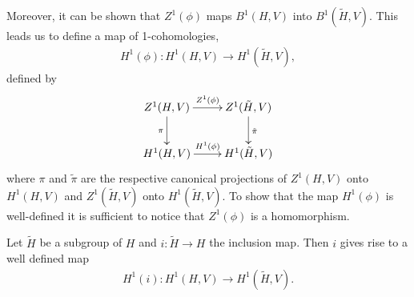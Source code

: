 Moreover, it can be shown that $Z^1(\phi)$ maps $B^1(H, V)$ into $B^1(\tilde{H}, V)$. This leads us to define a map of 1-cohomologies,
\begin{eqnarray*}
	H^1(\phi):H^1(H, V) \rightarrow H^1(\tilde{H}, V),
\end{eqnarray*}
defined by
\begin{displaymath}
	\xymatrix{
	Z^1(H, V) \ar[d]_{\pi} \ar[r]^{Z^1(\phi)} & Z^1(\tilde{H}, V) \ar[d]^{\tilde{\pi}}\\
	H^1(H, V) \ar[r]^{H^1(\phi)} & H^1(\tilde{H}, V)
	}
\end{displaymath}
where $\pi$ and $\tilde\pi$ are the respective canonical projections of $Z^1(H, V)$ onto $H^1(H, V)$ and $Z^1(\tilde{H}, V)$ onto $H^1(\tilde{H}, V)$. To show that the map $H^1(\phi)$ is well-defined it is sufficient to notice that $Z^1(\phi)$ is a homomorphism.

\begin{example}
Let $\tilde{H}$ be a subgroup of $H$ and $i:\tilde{H}\rightarrow H$ the inclusion map. Then $i$ gives rise to a well defined map
\begin{eqnarray*}
H^1(i):H^1(H, V)\rightarrow H^1(\tilde{H}, V).
\end{eqnarray*}
\end{example}

